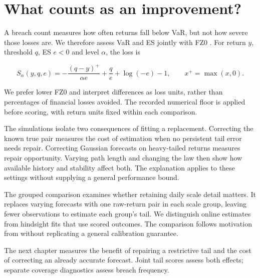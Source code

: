 \section{What counts as an improvement?}

A breach count measures how often returns fall below VaR, but not how severe those losses are. We therefore assess VaR and ES jointly with FZ0 \citep{fissler2016higher,patton2019dynamic}. For return $y$, threshold $q$, ES $e<0$ and level $\alpha$, the loss is

\begin{equation}
 S_\alpha(y,q,e)
 =-\frac{(q-y)^+}{\alpha e}+\frac{q}{e}+\log(-e)-1,
 \qquad x^+=\max(x,0).
 \label{eq:recal-score}
\end{equation}

We prefer lower FZ0 and interpret differences as loss units, rather than percentages of financial losses avoided. The recorded numerical floor is applied before scoring, with return units fixed within each comparison.

The simulations isolate two consequences of fitting a replacement. Correcting the known true pair measures the cost of estimation when no persistent tail error needs repair. Correcting Gaussian forecasts on heavy-tailed returns measures repair opportunity. Varying path length and changing the law then show how available history and stability affect both. The explanation applies to these settings without supplying a general performance bound.

The grouped comparison examines whether retaining daily scale detail matters. It replaces varying forecasts with one raw-return pair in each scale group, leaving fewer observations to estimate each group's tail. We distinguish online estimates from hindsight fits that use scored outcomes. The comparison follows motivation from \citet{foster2023calibeating} without replicating a general calibration guarantee.

The next chapter measures the benefit of repairing a restrictive tail and the cost of correcting an already accurate forecast. Joint tail scores assess both effects; separate coverage diagnostics assess breach frequency.